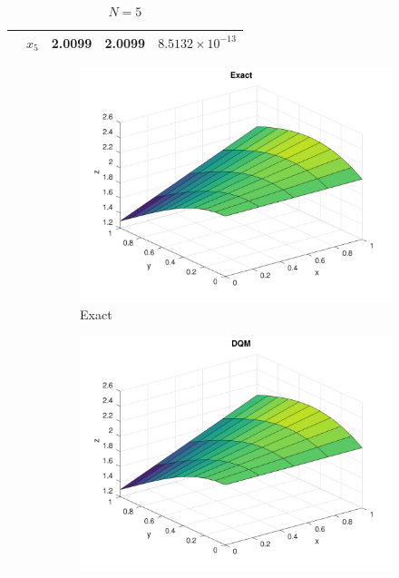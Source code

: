 \begin{solution}
\begin{english}
\begin{table}[h!]
\begin{tabular}{|c|c|c|c|c|}
		& $x_5$ & 2.0099 & 2.0099 & $8.5132 \times 10^{-13}$ \\
		\hline
	\end{tabular}
	\caption{$N=5$}
	\label{tab:secondexN5}
\end{table}
\end{english}
\begin{english}
	\begin{figure}[ht]
		\centering
		\begin{subfigure}{0.3\textwidth}
			\includegraphics[scale=0.05]{Figures/secondExactN5}
			\caption{Exact}
		\end{subfigure}
		\qquad \begin{subfigure}{0.3\textwidth}
			\includegraphics[scale=0.05]{Figures/secondN5}

\end{subfigure}
\end{figure}
\end{english}
\end{solution}
